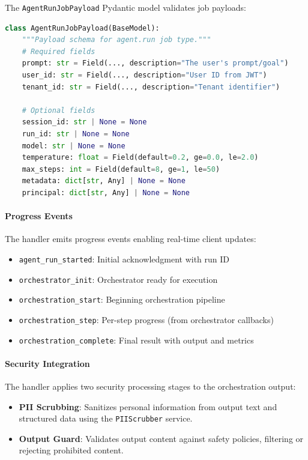 The \texttt{AgentRunJobPayload} Pydantic model validates job payloads:

\begin{lstlisting}[language=Python, caption={AgentRunJobPayload schema for agent.run jobs.}]
class AgentRunJobPayload(BaseModel):
    """Payload schema for agent.run job type."""
    # Required fields
    prompt: str = Field(..., description="The user's prompt/goal")
    user_id: str = Field(..., description="User ID from JWT")
    tenant_id: str = Field(..., description="Tenant identifier")
    
    # Optional fields
    session_id: str | None = None
    run_id: str | None = None
    model: str | None = None
    temperature: float = Field(default=0.2, ge=0.0, le=2.0)
    max_steps: int = Field(default=8, ge=1, le=50)
    metadata: dict[str, Any] | None = None
    principal: dict[str, Any] | None = None
\end{lstlisting}

\paragraph{Progress Events}

The handler emits progress events enabling real-time client updates:

\begin{itemize}
    \item \texttt{agent\_run\_started}: Initial acknowledgment with run ID
    \item \texttt{orchestrator\_init}: Orchestrator ready for execution
    \item \texttt{orchestration\_start}: Beginning orchestration pipeline
    \item \texttt{orchestration\_step}: Per-step progress (from orchestrator callbacks)
    \item \texttt{orchestration\_complete}: Final result with output and metrics
\end{itemize}

\paragraph{Security Integration}

The handler applies two security processing stages to the orchestration output:

\begin{itemize}
    \item \textbf{PII Scrubbing}: Sanitizes personal information from output text and structured data using the \texttt{PIIScrubber} service.
    \item \textbf{Output Guard}: Validates output content against safety policies, filtering or rejecting prohibited content.
\end{itemize}

